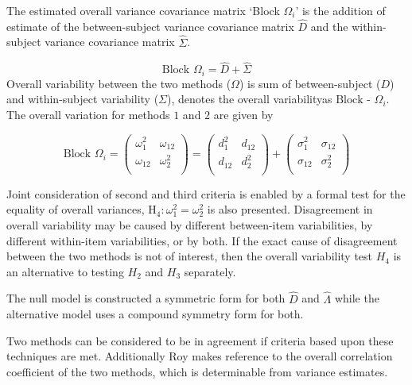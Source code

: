 \documentclass[12pt, a4paper]{report}
\theoremstyle{plain}
\theoremstyle{definition}
\theoremstyle{remark}
\begin{document}
The estimated overall variance covariance matrix `Block
$\Omega_{i}$' is the addition of estimate of the between-subject variance covariance matrix $\hat{D}$ and the within-subject variance covariance matrix $\hat{\Sigma}$.

\begin{equation}
\mbox{Block  }\Omega_{i} = \hat{D} + \hat{\Sigma}
\end{equation}
Overall variability between the two methods ($\Omega$) is sum of between-subject ($D$) and within-subject variability ($\Sigma$),
\citet{ARoy2009} denotes the overall variabilityas ${\mbox{Block - } \Omega_{i}}$. The overall variation for methods $1$ and $2$ are given by

\begin{center}
	\[\mbox{Block } {\Omega}_i = \left(\begin{array}{cc}
	\omega^2_1  & \omega_{12} \\
	\omega_{12} & \omega^2_2 \\
	\end{array}  \right)
	=  \left(
	\begin{array}{cc}
	d^2_1  & d_{12} \\
	d_{12} & d^2_2 \\
	\end{array} \right)+
	\left(
	\begin{array}{cc}
	\sigma^2_1  & \sigma_{12} \\
	\sigma_{12} & \sigma^2_2 \\
	\end{array}\right)
	\]
\end{center}


Joint consideration of second and third criteria is enabled by a formal test for the equality of overall variances, $\operatorname{H_4} : \omega^2_1 = \omega^2_2$ is also presented. Disagreement in overall variability may be caused by different between-item variabilities, by different within-item variabilities, or by both.  If the exact cause of disagreement between the two methods is not of interest, then the overall variability test $H_4$ is an alternative to testing $H_2$ and $H_3$ separately.



The null model is constructed a symmetric form for both ${\hat{D}}$ and ${\hat{\Lambda}}$ while the alternative model uses a compound symmetry form for both.

Two methods can be considered to be in agreement if criteria based upon these techniques are met. Additionally Roy makes reference to the overall correlation coefficient of the two methods, which is determinable from variance estimates.
\end{document}

